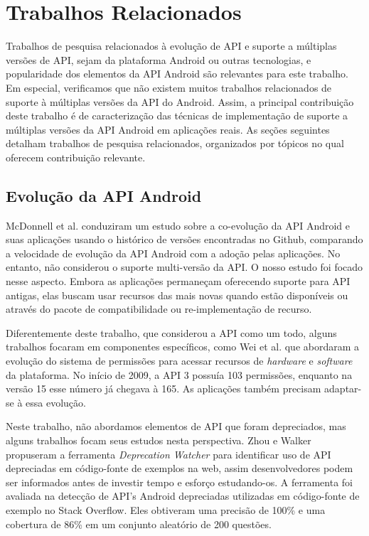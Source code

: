 \chapter{Trabalhos Relacionados} \label{ch:trabalhos-relacionados}

Trabalhos de pesquisa relacionados à evolução de API e suporte a múltiplas versões
de API, sejam da plataforma Android ou outras tecnologias, e popularidade dos
elementos da API Android são relevantes para este trabalho. Em especial, verificamos
que não existem muitos trabalhos relacionados de suporte à múltiplas versões da API
do Android. Assim, a principal contribuição deste trabalho é de caracterização das
técnicas de implementação de suporte a múltiplas versões da API Android em aplicações
reais. As seções seguintes detalham trabalhos de pesquisa relacionados, organizados
por tópicos no qual oferecem contribuição relevante.

\section{Evolução da API Android}

McDonnell et al. \cite{McDonnell2013} conduziram um estudo sobre a co-evolução da API
Android e suas aplicações usando o histórico de versões encontradas no Github, comparando
a velocidade de evolução da API Android com a adoção pelas aplicações. No entanto, não
considerou o suporte multi-versão da API. O nosso estudo foi focado nesse aspecto. Embora
as aplicações permaneçam oferecendo suporte para API antigas, elas buscam usar recursos das
mais novas quando estão disponíveis ou através do pacote de compatibilidade ou re-implementação
de recurso.

Diferentemente deste trabalho, que considerou a API como um todo, alguns trabalhos focaram
em componentes específicos, como Wei et al.\cite{Wei2016} que abordaram a evolução do sistema
de permissões para acessar recursos de \textit{hardware} e \textit{software} da plataforma.
No início de 2009, a API 3 possuía 103 permissões, enquanto na versão 15 esse número já chegava
à 165. As aplicações também precisam adaptar-se à essa evolução. 

Neste trabalho, não abordamos elementos de API que foram depreciados, mas alguns trabalhos
focam seus estudos nesta perspectiva.  Zhou e Walker \cite{Zhou2016} propuseram a ferramenta
\textit{Deprecation Watcher} para identificar uso de API depreciadas em código-fonte de exemplos
na web, assim desenvolvedores podem ser informados antes de investir tempo e esforço estudando-os.
A ferramenta foi avaliada na detecção de API's Android depreciadas utilizadas em código-fonte de exemplo no Stack Overflow. Eles obtiveram uma precisão de 100\% e uma cobertura de 86\% em um
conjunto aleatório de 200 questões.

